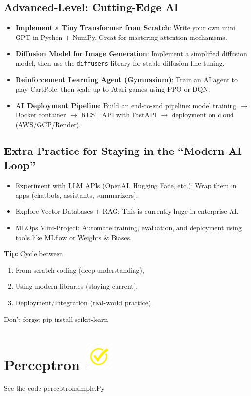 \documentclass{article}
\begin{document}
\subsection*{Advanced-Level: Cutting-Edge AI}
\begin{itemize}
    \item \textbf{Implement a Tiny Transformer from Scratch}: Write your own mini GPT in Python + NumPy. Great for mastering attention mechanisms.
    \item \textbf{Diffusion Model for Image Generation}: Implement a simplified diffusion model, then use the \texttt{diffusers} library for stable diffusion fine-tuning.
    \item \textbf{Reinforcement Learning Agent (Gymnasium)}: Train an AI agent to play CartPole, then scale up to Atari games using PPO or DQN.
    \item \textbf{AI Deployment Pipeline}: Build an end-to-end pipeline: model training $\rightarrow$ Docker container $\rightarrow$ REST API with FastAPI $\rightarrow$ deployment on cloud (AWS/GCP/Render).
\end{itemize}

\subsection*{Extra Practice for Staying in the ``Modern AI Loop''}
\begin{itemize}
    \item Experiment with LLM APIs (OpenAI, Hugging Face, etc.): Wrap them in apps (chatbots, assistants, summarizers).
    \item Explore Vector Databases + RAG: This is currently huge in enterprise AI.
    \item MLOps Mini-Project: Automate training, evaluation, and deployment using tools like MLflow or Weights \& Biases.
\end{itemize}

\noindent \textbf{Tip:} Cycle between 
\begin{enumerate}
    \item From-scratch coding (deep understanding),
    \item Using modern libraries (staying current),
    \item Deployment/Integration (real-world practice).
\end{enumerate}
Don't forget pip install scikit-learn

\section{Perceptron  \includegraphics[width=2em]{yellow.jpeg} }
See the code perceptronsimple.Py 
\end{document}
